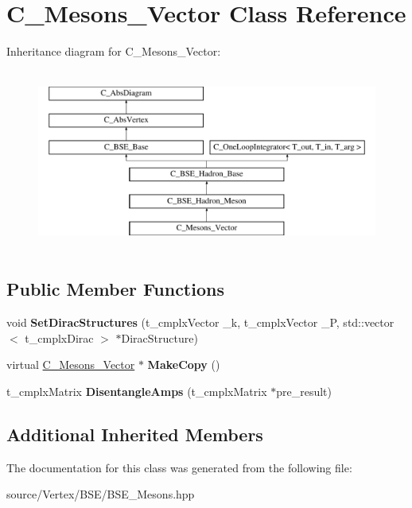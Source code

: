 \hypertarget{class_c___mesons___vector}{\section{C\-\_\-\-Mesons\-\_\-\-Vector Class Reference}
\label{class_c___mesons___vector}
}
Inheritance diagram for C\-\_\-\-Mesons\-\_\-\-Vector\-:\begin{figure}[H]
\begin{center}
\leavevmode
\includegraphics[height=6.000000cm]{class_c___mesons___vector}
\end{center}
\end{figure}
\subsection*{Public Member Functions}
\begin{DoxyCompactItemize}
\item 
\hypertarget{class_c___mesons___vector_a39855d839be872e41a3301c6a137c685}{void {\bfseries Set\-Dirac\-Structures} (t\-\_\-cmplx\-Vector \-\_\-k, t\-\_\-cmplx\-Vector \-\_\-\-P, std\-::vector$<$ t\-\_\-cmplx\-Dirac $>$ $\ast$Dirac\-Structure)}\label{class_c___mesons___vector_a39855d839be872e41a3301c6a137c685}

\item 
\hypertarget{class_c___mesons___vector_a33e74b9c4fbfd2b439137d9e54362dcc}{virtual \hyperlink{class_c___mesons___vector}{C\-\_\-\-Mesons\-\_\-\-Vector} $\ast$ {\bfseries Make\-Copy} ()}\label{class_c___mesons___vector_a33e74b9c4fbfd2b439137d9e54362dcc}

\item 
\hypertarget{class_c___mesons___vector_af0c5781fddc22f3cb91fcbc4bd97a654}{t\-\_\-cmplx\-Matrix {\bfseries Disentangle\-Amps} (t\-\_\-cmplx\-Matrix $\ast$pre\-\_\-result)}\label{class_c___mesons___vector_af0c5781fddc22f3cb91fcbc4bd97a654}

\end{DoxyCompactItemize}
\subsection*{Additional Inherited Members}


The documentation for this class was generated from the following file\-:\begin{DoxyCompactItemize}
\item 
source/\-Vertex/\-B\-S\-E/B\-S\-E\-\_\-\-Mesons.\-hpp\end{DoxyCompactItemize}
